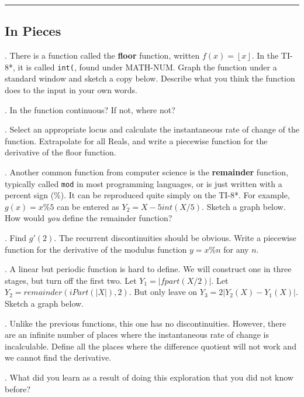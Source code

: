 \renewcommand{\columnseprule}{1.5pt}
\begin{multicols*}{2}
\noindent
\rule[0.5\baselineskip]{0.5\textwidth}{1pt}

\noindent
\subsection{In Pieces}
. There is a function called the \textbf{floor} function, written
$f(x)=\left\lfloor x \right\rfloor$.  In the TI-8*, it is called \texttt{int(},
found under MATH-NUM.  Graph the function under a standard 
window and sketch a copy below.  Describe what you
think the function does to the input in your own words.

\vspace{5cm}
.  In the function continuous?  If not, where not?  

\vspace{3cm}
. Select an appropriate locus and calculate the instantaneous rate of change
of the function.  Extrapolate for all Reals, and write a piecewise function
for the derivative of the floor function.

\vspace{3cm}
. Another common function from computer science is the \textbf{remainder}
function, typically called \texttt{mod} in most programming languages, or is just written with
a percent sign (\%).  It can be reproduced quite simply on the TI-8*.  For example,
$g(x)=x\%5$ can be entered as $Y_2=X-5int(X/5)$.  Sketch a graph below.
How would \emph{you} define the remainder function?  

\vspace{4cm}
. Find $g'(2)$.  The recurrent discontinuities should be obvious.  Write
a piecewise function for the derivative of the modulus function $y=x\%n$
for any $n$.

\vspace{4cm}
. A linear but periodic function is hard to define.  We will construct one in
three stages, but turn off the first two.  Let $Y_1=|fpart(X/2)|$.  Let
$Y_2=remainder(iPart(|X|),2)$.  But only leave on $Y_3=2|Y_2(X)-Y_1(X)|$.
Sketch a graph below.

\vspace{4cm}
. Unlike the previous functions, this one has no discontinuities.  However,
there are an infinite number of places where the instantaneous rate of change
is incalculable.  Define all the places where the difference quotient will not
work and we cannot find the derivative.

\vspace{3cm}
. What did you learn as a result of doing this exploration that you did not
know before?
\end{multicols*}